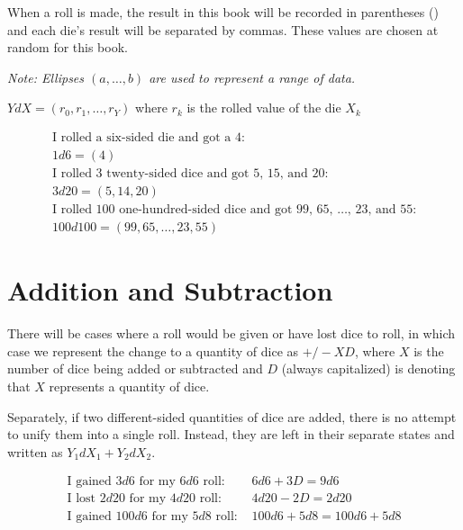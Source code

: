 \documentclass[../main.tex]{subfiles}
\begin{document}
    When a roll is made, the result in this book will be recorded in parentheses () and each die's result will be separated by commas. These values are chosen at random for this book.
    
    \emph{Note: Ellipses $(a,\ldots,b)$ are used to represent a range of data.}
    \begin{mdframed}[style=Arrata]
        \begin{center}
            $YdX = (r_{0},r_{1},\ldots,r_{Y})$ where $r_{k}$ is the rolled value of the die $X_{k}$
        \end{center}
        \begin{equation*}
            \begin{gathered}
            \text{I rolled a six-sided die and got a 4:}                                    \\
                    1d6  = (4)                                                              \\
            \text{I rolled 3 twenty-sided dice and got 5, 15, and 20:}                      \\
                    3d20 = (5, 14, 20)                                                      \\
            \text{I rolled 100 one-hundred-sided dice and got 99, 65, \ldots, 23, and 55:}  \\
                    100d100 = (99, 65, \ldots, 23, 55)                                      
            \end{gathered}
        \end{equation*}
    \end{mdframed}

    \section{Addition and Subtraction}

    There will be cases where a roll would be given or have lost dice to roll, in which case we represent the change to a quantity of dice as $+/-XD$, where $X$ is the number of dice being added or subtracted and $D$ (always capitalized) is denoting that $X$ represents a quantity of dice.

    Separately, if two different-sided quantities of dice are added, there is no attempt to unify them into a single roll. Instead, they are left in their separate states and written as $Y_{1}dX_{1} + Y_{2}dX_{2}$.
    \\
    \begin{mdframed}[style=Arrata]
        \begin{align*}
            \text{I gained $3d6$ for my $6d6$ roll: }   & 6d6 + 3D = 9d6            \\
            \text{I lost $2d20$ for my $4d20$ roll: }   & 4d20 - 2D = 2d20          \\
            \text{I gained $100d6$ for my $5d8$ roll: } & 100d6 + 5d8 = 100d6 + 5d8    
        \end{align*}
    \end{mdframed}
\end{document}
